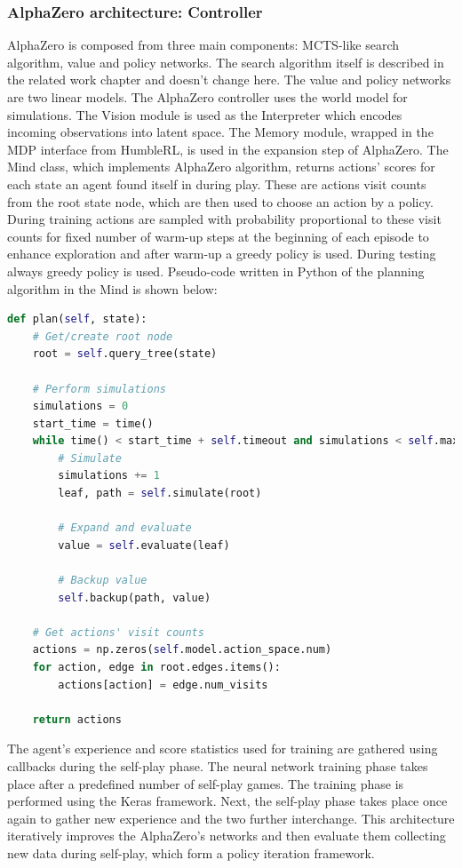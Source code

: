\subsubsection{AlphaZero architecture: Controller}
AlphaZero is composed from three main components: MCTS-like search algorithm, value and policy networks. The search algorithm itself is described in the related work chapter and doesn't change here. The value and policy networks are two linear models. 
The AlphaZero controller uses the world model for simulations. The Vision module is used as the Interpreter which encodes incoming observations into latent space. The Memory module, wrapped in the MDP interface from HumbleRL, is used in the expansion step of AlphaZero. The Mind class, which implements AlphaZero algorithm, returns actions' scores for each state an agent found itself in during play. These are actions visit counts from the root state node, which are then used to choose an action by a policy. During training actions are sampled with probability proportional to these visit counts for fixed number of warm-up steps at the beginning of each episode to enhance exploration and after warm-up a greedy policy is used. During testing always greedy policy is used.
Pseudo-code written in Python of the planning algorithm in the Mind is shown below:
\begin{lstlisting}[language=Python]
def plan(self, state):
    # Get/create root node
    root = self.query_tree(state)

    # Perform simulations
    simulations = 0
    start_time = time()
    while time() < start_time + self.timeout and simulations < self.max_simulations:
        # Simulate
        simulations += 1
        leaf, path = self.simulate(root)

        # Expand and evaluate
        value = self.evaluate(leaf)

        # Backup value
        self.backup(path, value)

    # Get actions' visit counts
    actions = np.zeros(self.model.action_space.num)
    for action, edge in root.edges.items():
        actions[action] = edge.num_visits

    return actions
\end{lstlisting}

The agent's experience and score statistics used for training are gathered using callbacks during the self-play phase. The neural network training phase takes place after a predefined number of self-play games. The training phase is performed using the Keras \cite{Code.Keras} framework. Next, the self-play phase takes place once again to gather new experience and the two further interchange. This architecture iteratively improves the AlphaZero's networks and then evaluate them collecting new data during self-play, which form a policy iteration framework.

